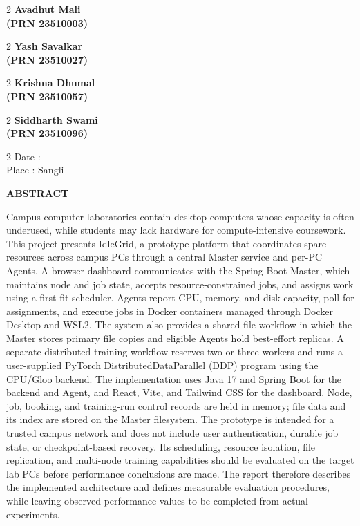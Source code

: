 \documentclass{article}
\begin{document}
		\begin{multicols}{2}
\textbf{Avadhut Mali\\ (PRN 23510003)}
\end{multicols}
\begin{multicols}{2}
\textbf{Yash Savalkar\\ (PRN 23510027)}
\end{multicols}
\begin{multicols}{2}
\textbf{Krishna Dhumal\\ (PRN 23510057)}
\end{multicols}
\begin{multicols}{2}
\textbf{Siddharth Swami\\ (PRN 23510096)}
\end{multicols}

		\begin{multicols}{2}
		\noindent
		  Date : \\
		  Place : Sangli
		\end{multicols}
	
	\pagebreak
	\begin{center}
	\Large\textbf{ABSTRACT}
	\end{center}
	\noindent
Campus computer laboratories contain desktop computers whose capacity is often underused, while students may lack hardware for compute-intensive coursework. This project presents IdleGrid, a prototype platform that coordinates spare resources across campus PCs through a central Master service and per-PC Agents. A browser dashboard communicates with the Spring Boot Master, which maintains node and job state, accepts resource-constrained jobs, and assigns work using a first-fit scheduler. Agents report CPU, memory, and disk capacity, poll for assignments, and execute jobs in Docker containers managed through Docker Desktop and WSL2. The system also provides a shared-file workflow in which the Master stores primary file copies and eligible Agents hold best-effort replicas. A separate distributed-training workflow reserves two or three workers and runs a user-supplied PyTorch DistributedDataParallel (DDP) program using the CPU/Gloo backend. The implementation uses Java 17 and Spring Boot for the backend and Agent, and React, Vite, and Tailwind CSS for the dashboard. Node, job, booking, and training-run control records are held in memory; file data and its index are stored on the Master filesystem. The prototype is intended for a trusted campus network and does not include user authentication, durable job state, or checkpoint-based recovery. Its scheduling, resource isolation, file replication, and multi-node training capabilities should be evaluated on the target lab PCs before performance conclusions are made. The report therefore describes the implemented architecture and defines measurable evaluation procedures, while leaving observed performance values to be completed from actual experiments.
	
\end{document}

